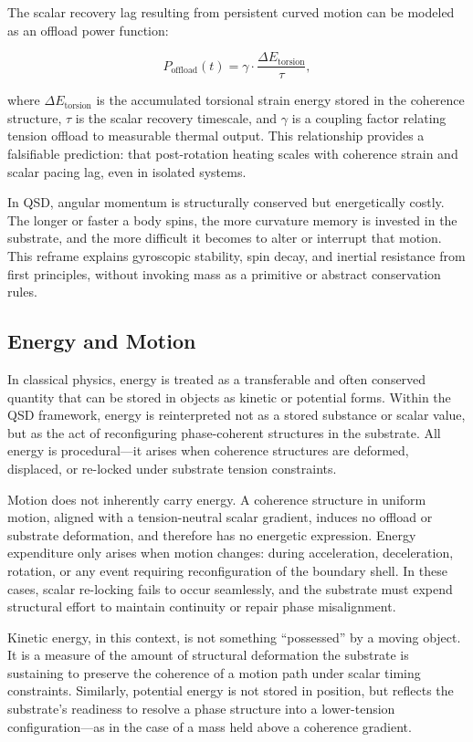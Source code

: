 \documentclass[entropy,article,submit,pdftex,moreauthors]{Definitions/mdpi}
\begin{document}
The scalar recovery lag resulting from persistent curved motion can be modeled as an offload power function:

\begin{equation}
    P_{\text{offload}}(t) = \gamma \cdot \frac{\Delta E_{\text{torsion}}}{\tau},
\end{equation}

where \( \Delta E_{\text{torsion}} \) is the accumulated torsional strain energy stored in the coherence structure, \( \tau \) is the scalar recovery timescale, and \( \gamma \) is a coupling factor relating tension offload to measurable thermal output. This relationship provides a falsifiable prediction: that post-rotation heating scales with coherence strain and scalar pacing lag, even in isolated systems.


In QSD, angular momentum is structurally conserved but energetically costly. The longer or faster a body spins, the more curvature memory is invested in the substrate, and the more difficult it becomes to alter or interrupt that motion. This reframe explains gyroscopic stability, spin decay, and inertial resistance from first principles, without invoking mass as a primitive or abstract conservation rules.
\subsection{Energy and Motion}

In classical physics, energy is treated as a transferable and often conserved quantity that can be stored in objects as kinetic or potential forms. Within the QSD framework, energy is reinterpreted not as a stored substance or scalar value, but as the act of reconfiguring phase-coherent structures in the substrate. All energy is procedural---it arises when coherence structures are deformed, displaced, or re-locked under substrate tension constraints.

Motion does not inherently carry energy. A coherence structure in uniform motion, aligned with a tension-neutral scalar gradient, induces no offload or substrate deformation, and therefore has no energetic expression. Energy expenditure only arises when motion changes: during acceleration, deceleration, rotation, or any event requiring reconfiguration of the boundary shell. In these cases, scalar re-locking fails to occur seamlessly, and the substrate must expend structural effort to maintain continuity or repair phase misalignment.

Kinetic energy, in this context, is not something “possessed” by a moving object. It is a measure of the amount of structural deformation the substrate is sustaining to preserve the coherence of a motion path under scalar timing constraints. Similarly, potential energy is not stored in position, but reflects the substrate's readiness to resolve a phase structure into a lower-tension configuration---as in the case of a mass held above a coherence gradient.
\end{document}
